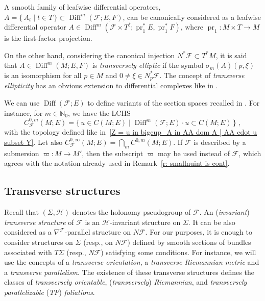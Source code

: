 \documentclass{memo-l}
\theoremstyle{plain}
\theoremstyle{definition}
\theoremstyle{remark}
\newcommand{\N}{\mathbb{N}}
\newcommand{\FF}{\mathcal{F}}
\newcommand{\HH}{\mathcal{H}}
\newcommand{\Diff}{\operatorname{Diff}}
\newcommand{\pr}{\operatorname{pr}}
\numberwithin{section}{chapter}
\numberwithin{equation}{section}%
\begin{document}
A smooth family of leafwise differential operators, $A=\{\,A_t\mid t\in T\,\}\subset\Diff^m(\FF;E,F)$, can be canonically considered as a leafwise differential operator $A\in\Diff^m(\FF\times T^\delta;\pr_1^*E,\pr_1^*F)$, where $\pr_1:M\times T\to M$ is the first-factor projection.

On the other hand, considering the canonical injection $N^*\FF\subset T^*M$, it is said that $A\in\Diff^m(M;E,F)$ is \emph{transversely elliptic}  if the symbol $\sigma_m(A)(p,\xi)$ is an isomorphism for all $p\in M$ and $0\ne\xi\in N^*_p\FF$. The concept of \emph{transverse ellipticity} has an obvious extension to differential complexes like in .

We can use $\Diff(\FF;E)$ to define variants of the section spaces recalled in . For instance, for $m\in\N_0$, we have the LCHS
\[
C^{0,m}_\FF(M;E)=\{\,u\in C(M;E)\mid\Diff^m(\FF;E)\cdot u\subset C(M;E)\,\}\;,
\]
with the topology defined like in~\eqref{Z = u in bigcup_A in AA dom A | AA cdot u subset Y}. Let also $C^{0,\infty}_\FF(M;E)=\bigcap_mC^{0,m}(M;E)$. If $\FF$ is described by a submersion $\varpi:M\to M'$, then the subscript $\varpi$ may be used instead of $\FF$, which agrees with the notation already used in Remark~\ref{r: smallnuint is cont}.



\subsection{Transverse structures}\label{ss: transverse structures}

Recall that $(\Sigma,\HH)$ denotes the holonomy pseudogroup of $\FF$. An (\emph{invariant}) \emph{transverse structure}  of $\FF$ is an $\HH$-invariant structure on $\Sigma$. It can be also considered as a $\nabla^\FF$-parallel structure on $N\FF$. For our purposes, it is enough to consider structures on $\Sigma$ (resp., on $N\FF$) defined by smooth sections of bundles associated with $T\Sigma$ (resp., $N\FF$) satisfying some conditions. For instance, we will use the concepts of a \emph{transverse orientation}, a \emph{transverse Riemannian metric} and a \emph{transverse parallelism}. The existence of these transverse structures defines the classes of \emph{transversely orientable}, (\emph{transversely}) \emph{Riemannian}, and \emph{transversely parallelizable} (\emph{TP}) \emph{foliations}.   
\end{document}
